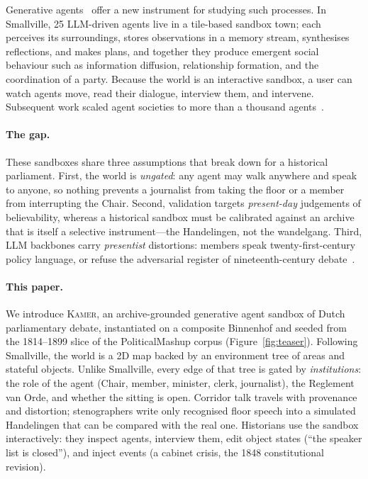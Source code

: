 \documentclass[sigconf,review,anonymous]{acmart}
\newcommand{\sys}{\textsc{Kamer}}
\begin{document}
Generative agents~\cite{park2023generative} offer a new instrument for
studying such processes. In Smallville, 25 LLM-driven agents live in a
tile-based sandbox town; each perceives its surroundings, stores
observations in a memory stream, synthesises reflections, and makes plans,
and together they produce emergent social behaviour such as information
diffusion, relationship formation, and the coordination of a party. Because
the world is an interactive sandbox, a user can watch agents move, read
their dialogue, interview them, and intervene. Subsequent work scaled agent
societies to more than a thousand agents~\cite{al2024projectsid,piao2025agentsociety}.

\paragraph{The gap.} These sandboxes share three assumptions that break
down for a historical parliament. First, the world is \emph{ungated}: any
agent may walk anywhere and speak to anyone, so nothing prevents a
journalist from taking the floor or a member from interrupting the Chair.
Second, validation targets \emph{present-day} judgements of believability,
whereas a historical sandbox must be calibrated against an archive that is
itself a selective instrument---the Handelingen, not the wandelgang.
Third, LLM backbones carry \emph{presentist} distortions: members speak
twenty-first-century policy language, or refuse the adversarial register of
nineteenth-century debate~\cite{wang2025identity,bender2021parrots}.

\paragraph{This paper.} We introduce \sys{}, an archive-grounded generative
agent sandbox of Dutch parliamentary debate, instantiated on a composite
Binnenhof and seeded from the 1814--1899 slice of the PoliticalMashup
corpus (Figure~\ref{fig:teaser}). Following Smallville, the world is a 2D
map backed by an environment tree of areas and stateful objects. Unlike
Smallville, every edge of that tree is gated by \emph{institutions}: the
role of the agent (Chair, member, minister, clerk, journalist), the
Reglement van Orde, and whether the sitting is open. Corridor talk travels
with provenance and distortion; stenographers write only recognised floor
speech into a simulated Handelingen that can be compared with the real one.
Historians use the sandbox interactively: they inspect agents, interview
them, edit object states (``the speaker list is closed''), and inject
events (a cabinet crisis, the 1848 constitutional revision).
\end{document}
